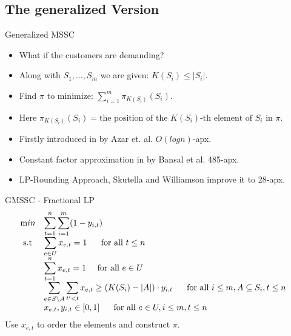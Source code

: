 \documentclass{beamer}
\begin{document}
\subsection{The generalized Version}

\begin{frame}{Generalized MSSC}
    \begin{itemize}
         \item What if the customers are demanding?
         \item Along with $S_1, \ldots, S_m$ we are given: $K(S_i) \leq |S_i|$.
         \item Find $\pi$ to minimize: $\sum_{i=1}^m \pi_{K(S_i)} (S_i)$.
         \item Here $\pi_{K(S_i)} (S_i) = \text{the position of the } K(S_i) \text{-th element of } S_i \text{ in } \pi$.
         \item Firstly introduced in \cite{AGY09} by Azar et. al. $O(logn)$-apx.
         \item Constant factor approximation in \cite{BGK10} by Bansal et al. 485-apx.
         \item LP-Rounding Approach, Skutella and Williamson \cite{SW11} improve it to 28-apx.
    \end{itemize}    
\end{frame}

\begin{frame}{GMSSC - Fractional LP}
    \begin{equation*}
        \begin{array}{ll@{}ll}
            \text min & \displaystyle \sum_{t = 1}^n \sum_{i = 1}^{m} ( 1 - y_{i,t} ) &\\
            \text{ s.t } & \displaystyle \sum_{e \in U} x_{e,t} = 1~~~~\text{ for all }t \leq n &&\\
            & \displaystyle \sum_{t=1}^{n} x_{e,t} = 1~~~~\text{for all }e \in U &&\\
            & \displaystyle \sum_{e \in S \setminus A} \sum_{t'<t} x_{e,t} \geq (K(S_i) - |A|) \cdot y_{i,t}~~~~\text{ for all } i \leq m, A \subseteq S_i, t \leq n &&\\
            & \displaystyle x_{e,t}, y_{i,t} \in [ 0, 1 ] ~~~~\text{ for all } e \in U, i \leq m, t \leq n
        \end{array}
    \end{equation*}
     Use $x_{e,t}$ to order the elements and construct $\pi$.
\end{frame}
\end{document}
